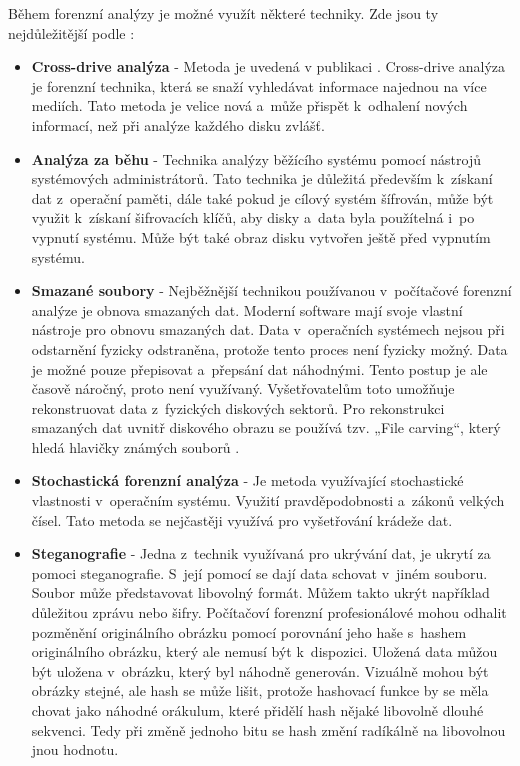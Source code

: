 \documentclass[thesis=B,czech]{FITthesis}[2012/06/26]
\begin{document}
Během forenzní analýzy je možné využít některé techniky. Zde jsou ty nejdůležitější podle \cite{for_w}:
\begin{itemize}
\item \textbf{Cross-drive analýza} - Metoda je uvedená v publikaci \cite{garfinkel2006forensic}. Cross-drive analýza je forenzní technika, která se snaží vyhledávat informace najednou na více mediích. Tato metoda je velice nová a~může přispět k~odhalení nových informací, než při analýze každého disku zvlášť.

\item \textbf{Analýza za běhu} - Technika analýzy běžícího systému pomocí nástrojů systémových administrátorů. Tato technika je důležitá především k~získaní dat z~operační paměti, dále také pokud je cílový systém šífrován, může být využit k~získaní šifrovacích klíčů, aby disky a~data byla použítelná i~po vypnutí systému. Může být také obraz disku vytvořen ještě před vypnutím systému.

\item \textbf{Smazané soubory} - Nejběžnější technikou používanou v~počítačové forenzní analýze je obnova smazaných dat. Moderní software mají svoje vlastní nástroje pro obnovu smazaných dat. Data v~operačních systémech nejsou při odstarnění fyzicky odstraněna, protože tento proces není fyzicky možný. Data je možné pouze přepisovat a~přepsání dat náhodnými. Tento postup je ale časově náročný,  proto není využívaný. Vyšetřovatelům toto umožňuje rekonstruovat data z~fyzických diskových sektorů. Pro rekonstrukci smazaných dat uvnitř diskového obrazu se používá tzv. „File carving“, který hledá hlavičky známých souborů \cite{for_w}. 

\item \textbf{Stochastická forenzní analýza} - Je metoda využívající stochastické vlastnosti v~operačním systému. Využití pravděpodobnosti a~zákonů velkých čísel. Tato metoda se nejčastěji využívá pro vyšetřování krádeže dat.

\item \textbf{Steganografie} - Jedna z~technik využívaná pro ukrývání dat, je ukrytí za pomoci steganografie. S~její pomocí se dají data schovat v~jiném souboru. Soubor může představovat libovolný formát. Můžem takto ukrýt například důležitou zprávu nebo šifry. Počítačoví forenzní profesionálové mohou odhalit pozměnění originálního obrázku pomocí porovnání jeho haše s~hashem originálního obrázku, který ale nemusí být k~dispozici. Uložená data můžou být uložena v~obrázku, který byl náhodně generován. Vizuálně mohou být obrázky stejné, ale hash se může lišit, protože hashovací funkce by se měla chovat jako náhodné orákulum, které přidělí hash nějaké libovolně dlouhé sekvenci. Tedy při změně jednoho bitu se hash změní radíkálně na libovolnou jnou hodnotu.
\end{itemize}
\end{document}
